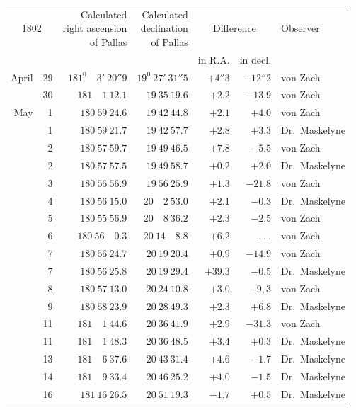 \begin{center}
{\small\setlength{\tabcolsep}{4pt}
\begin{tabular}{r r|r|r|r|r|l}
\multicolumn{2}{c|}{1802}&\shortstack{Calculated\\right ascension\\of Pallas}&\shortstack{Calculated\\declination\\of Pallas}&\multicolumn{2}{c|}{Difference}&Observer\\
\multicolumn{2}{c|}{}&&&in R.A.&in decl.&\\\hline
April&29&$181^0\quad3'\ 20''9$&$19^0\ 27'\ 31''5$&$+4''3$&$-12''2$&von Zach\\
&30&$181\quad1\ 12.1$&$19\ 35\ 19.6$&$+2.2$&$-13.9$&von Zach\\
May&1&$180\ 59\ 24.6$&$19\ 42\ 44.8$&$+2.1$&$+4.0$&von Zach\\
&1&$180\ 59\ 21.7$&$19\ 42\ 57.7$&$+2.8$&$+3.3$&Dr.\ Maskelyne\\
&2&$180\ 57\ 59.7$&$19\ 49\ 46.5$&$+7.8$&$-5.5$&von Zach\\
&2&$180\ 57\ 57.5$&$19\ 49\ 58.7$&$+0.2$&$+2.0$&Dr.\ Maskelyne\\
&3&$180\ 56\ 56.9$&$19\ 56\ 25.9$&$+1.3$&$-21.8$&von Zach\\
&4&$180\ 56\ 15.0$&$20\quad2\ 53.0$&$+2.1$&$-0.3$&Dr.\ Maskelyne\\
&5&$180\ 55\ 56.9$&$20\quad8\ 36.2$&$+2.3$&$-2.5$&von Zach\\
&6&$180\ 56\quad0.3$&$20\ 14\quad8.8$&$+6.2$&$\ .\ .\ .$&von Zach\\
&7&$180\ 56\ 24.7$&$20\ 19\ 20.4$&$+0.9$&$-14.9$&von Zach\\
&7&$180\ 56\ 25.8$&$20\ 19\ 29.4$&$+39.3$&$-0.5$&Dr.\ Maskelyne\\
&8&$180\ 57\ 13.0$&$20\ 24\ 10.8$&$+3.0$&$-9{,}3$&von Zach\\
&9&$180\ 58\ 23.9$&$20\ 28\ 49.3$&$+2.3$&$+6.8$&Dr.\ Maskelyne\\
&11&$181\quad1\ 44.6$&$20\ 36\ 41.9$&$+2.9$&$-31.3$&von Zach\\
&11&$181\quad1\ 48.3$&$20\ 36\ 48.5$&$+3.4$&$+0.3$&Dr.\ Maskelyne\\
&13&$181\quad6\ 37.6$&$20\ 43\ 31.4$&$+4.6$&$-1.7$&Dr.\ Maskelyne\\
&14&$181\quad9\ 33.4$&$20\ 46\ 25.2$&$+4.0$&$-1.5$&Dr.\ Maskelyne\\
&16&$181\ 16\ 26.5$&$20\ 51\ 19.3$&$-1.7$&$+0.5$&Dr.\ Maskelyne
\end{tabular}}
\end{center}

